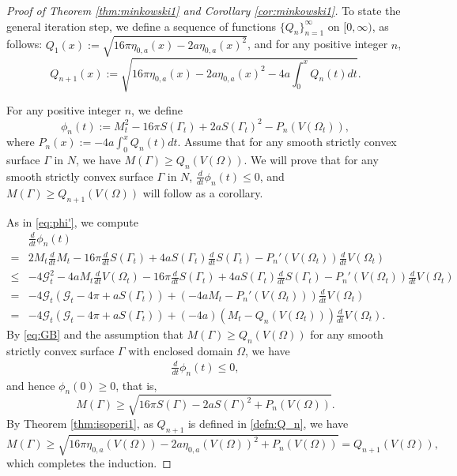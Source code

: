 \documentclass[11pt]{amsart}
\theoremstyle{definition}
\newcommand{\G}{\mathcal{G}}
\theoremstyle{remark}
\numberwithin{equation}{section}
\begin{document}
\begin{proof}[Proof of Theorem \ref{thm:minkowski1} and Corollary \ref{cor:minkowski1}]
	To state the general iteration step, we define a sequence of functions $\{Q_n\}_{n=1}^{\infty}$ on $[0,\infty)$, as follows: 
	$Q_1(x) := \sqrt{16 \pi\eta_{0,a}(x) - 2a \eta_{0,a}(x)^2}$, and for any positive integer $n$,
	\begin{equation}\label{defn:Q_n}
		Q_{n+1}(x) := \sqrt{16 \pi \eta_{0,a}(x) - 2a \eta_{0,a}(x)^2 - 4a \int_{0}^{x} Q_n(t)dt }.
	\end{equation}
	
	For any positive integer $n$, we define
	\begin{equation*}
		\phi_n(t) := M_t^2 - 16\pi S(\Gamma_t) + 2 a S(\Gamma_t)^2 - P_n(V(\Omega_t)),
	\end{equation*}
	where $P_n(x):= -4a \int_{0}^{x} Q_n(t) dt$. 
	Assume that for any smooth strictly convex surface $\Gamma$ in $N$, we have $M(\Gamma) \geq Q_{n}(V(\Omega))$. We will prove that for any smooth strictly convex surface $\Gamma$ in $N$, $ \frac{d}{dt} \phi_n(t) \leq 0$, and $M(\Gamma) \geq Q_{n+1}(V(\Omega))$ will follow as a corollary.
	
	As in \eqref{eq:phi'}, we compute 
	\begin{align}
		\label{eq:iterate:phi'}
		&\frac{d}{dt}\phi_n(t) 
		\\
		\nonumber
		=&
		2 M_t \frac{d}{dt}M_t
		-16\pi \frac{d}{dt}S(\Gamma_t) 
		+4aS(\Gamma_t)\frac{d}{dt}S(\Gamma_t)
		-  P_n'(V(\Omega_t)) \frac{d}{dt} V(\Omega_t)
		\\
		\nonumber
		\leq
		&
		-4 \G_t^2 -4 a M_t  \frac{d}{dt} V(\Omega_t) 
		-16\pi \frac{d}{dt}S(\Gamma_t) 
		+4aS(\Gamma_t)\frac{d}{dt}S(\Gamma_t)
		-  P_n'(V(\Omega_t)) \frac{d}{dt} V(\Omega_t)
		\\
		\nonumber
		=&
		-4 \G_t ( \G_t - 4\pi + a S(\Gamma_t))
		+
		(-4a M_t - P_n'(V(\Omega_t)) )\frac{d}{dt} V(\Omega_t)
		\\
		\nonumber
		=&
		-4 \G_t ( \G_t - 4\pi + a S(\Gamma_t))
		+
		(-4a)( M_t - Q_n(V(\Omega_t)) )\frac{d}{dt} V(\Omega_t).
	\end{align}
	By \eqref{eq:GB} and the assumption that $M(\Gamma) \geq Q_{n}(V(\Omega))$ for any smooth strictly convex surface $\Gamma$ with enclosed domain $\Omega$, we have 
	\begin{align*}
		\frac{d}{dt}\phi_n(t) \leq 0,
	\end{align*}
	and hence $\phi_n(0) \geq 0$, that is,
	\begin{equation*}
		M(\Gamma) \geq \sqrt{16\pi S(\Gamma) -2 a S(\Gamma)^2 + P_n(V(\Omega))}.
	\end{equation*}
	By Theorem \ref{thm:isoperi1}, as $Q_{n+1}$ is defined in \eqref{defn:Q_n}, we have
	\begin{equation*}
		M(\Gamma) \geq \sqrt{16\pi \eta_{0,a}(V(\Omega)) -2 a \eta_{0,a}(V(\Omega))^2 + P_n(V(\Omega))} = Q_{n+1}(V(\Omega)),
	\end{equation*}
	which completes the induction. 
	

\end{proof}
\end{document}
